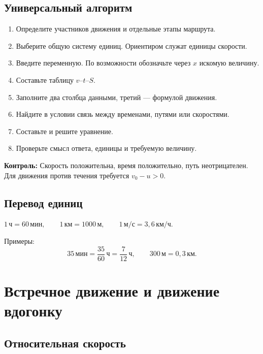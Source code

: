\documentclass[a4paper,12pt]{article}
\newcommand{\unit}[1]{\,\text{#1}}
\newcommand{\formula}[1]{%
  \begin{center}
    \large\color{darkaccent}\ensuremath{#1}
  \end{center}
}
\newcommand{\checkpoint}[1]{%
  \par\smallskip
  {\color{warn}\textbf{Контроль:} #1}\par\smallskip
}
\begin{document}
\subsection{Универсальный алгоритм}

\begin{enumerate}
  \item Определите участников движения и отдельные этапы маршрута.
  \item Выберите общую систему единиц. Ориентиром служат единицы скорости.
  \item Введите переменную. По возможности обозначьте через $x$ искомую величину.
  \item Составьте таблицу $v$--$t$--$S$.
  \item Заполните два столбца данными, третий --- формулой движения.
  \item Найдите в условии связь между временами, путями или скоростями.
  \item Составьте и решите уравнение.
  \item Проверьте смысл ответа, единицы и требуемую величину.
\end{enumerate}

\checkpoint{
  Скорость положительна, время положительно, путь неотрицателен.
  Для движения против течения требуется $v_0-u>0$.
}

\subsection{Перевод единиц}

\formula{
  1\unit{ч}=60\unit{мин},
  \qquad
  1\unit{км}=1000\unit{м},
  \qquad
  1\unit{м/с}=3{,}6\unit{км/ч}.
}

Примеры:
\[
35\unit{мин}
=
\frac{35}{60}\unit{ч}
=
\frac{7}{12}\unit{ч},
\qquad
300\unit{м}
=
0{,}3\unit{км}.
\]

\section{Встречное движение и движение вдогонку}

\subsection{Относительная скорость}
\end{document}
